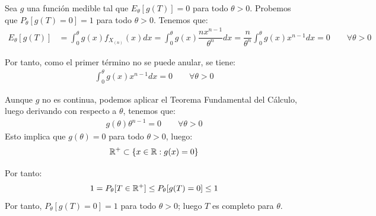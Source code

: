\begin{ejemplo}
    Sea $g$ una función medible tal que $E_\theta[g(T)] = 0$ para todo $\theta > 0$. Probemos que $P_\theta[g(T)=0] = 1$ para todo $\theta > 0$. Tenemos que:
    \begin{align*}
        E_\theta[g(T)] &= \int_0^\theta g(x) f_{X_{(n)}}(x) dx = \int_0^\theta g(x) \dfrac{n x^{n-1}}{\theta^n} dx = \dfrac{n}{\theta^n} \int_0^\theta g(x) x^{n-1} dx = 0\qquad \forall \theta > 0
    \end{align*}

    Por tanto, como el primer término no se puede anular, se tiene:
    \begin{align*}
        \int_0^\theta g(x) x^{n-1} dx = 0\qquad \forall \theta > 0
    \end{align*}

    Aunque $g$ no es continua, podemos aplicar el Teorema Fundamental del Cálculo, luego derivando con respecto a $\theta$, tenemos que:
    \begin{align*}
        g(\theta) \theta^{n-1} = 0\qquad \forall \theta > 0
    \end{align*}
    Esto implica que $g(\theta) = 0$ para todo $\theta > 0$, luego:
    \begin{equation*}
        \mathbb{R}^+ \subset \{x\in\mathbb{R} : g(x) = 0\}
    \end{equation*}


    Por tanto:
    \begin{equation*}
        1 = P_\theta[T\in \mathbb{R}^+ ] \leq P_\theta[g(T)=0]\leq 1
    \end{equation*}
    Por tanto, $P_\theta[g(T)=0] = 1$ para todo $\theta > 0$; luego $T$ es completo para $\theta$.
\end{ejemplo}

